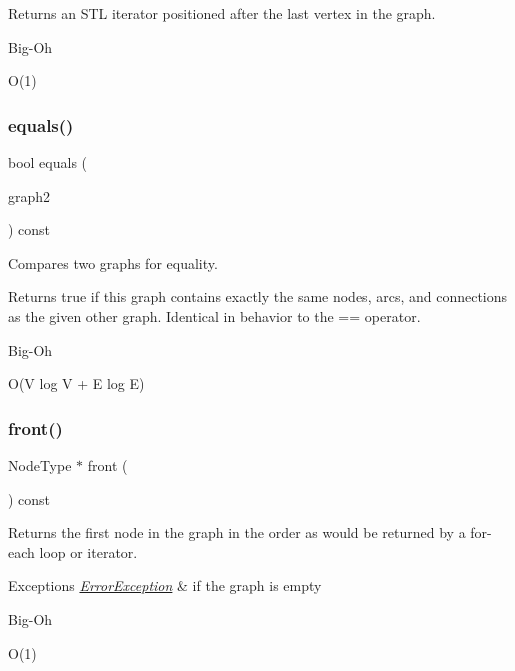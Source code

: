 Returns an S\+TL iterator positioned after the last vertex in the graph. 

\begin{DoxyRefDesc}{Big-\/\+Oh}
\item[\mbox{\hyperlink{BigOh__BigOh000092}{Big-\/\+Oh}}]O(1) \end{DoxyRefDesc}
\mbox{\label{classGraph_a6bec43eb3dfdf3d23eb328b406edf44a}} 
\subsubsection{\texorpdfstring{equals()}{equals()}}
{\footnotesize\ttfamily bool equals (\begin{DoxyParamCaption}\item[{const \mbox{\hyperlink{classGraph}{Graph}}$<$ Node\+Type, Arc\+Type $>$ \&}]{graph2 }\end{DoxyParamCaption}) const}



Compares two graphs for equality. 

Returns {\ttfamily true} if this graph contains exactly the same nodes, arcs, and connections as the given other graph. Identical in behavior to the == operator. \begin{DoxyRefDesc}{Big-\/\+Oh}
\item[\mbox{\hyperlink{BigOh__BigOh000058}{Big-\/\+Oh}}]O(V log V + E log E) \end{DoxyRefDesc}
\mbox{\label{classGraph_a7b7c2c1738f8e7faf84c54d7642992fa}} 
\subsubsection{\texorpdfstring{front()}{front()}}
{\footnotesize\ttfamily Node\+Type $\ast$ front (\begin{DoxyParamCaption}{ }\end{DoxyParamCaption}) const}



Returns the first node in the graph in the order as would be returned by a for-\/each loop or iterator. 


\begin{DoxyExceptions}{Exceptions}
{\em \mbox{\hyperlink{classErrorException}{Error\+Exception}}} & if the graph is empty \\
\hline
\end{DoxyExceptions}
\begin{DoxyRefDesc}{Big-\/\+Oh}
\item[\mbox{\hyperlink{BigOh__BigOh000059}{Big-\/\+Oh}}]O(1) \end{DoxyRefDesc}
\mbox{\label{classGraph_a7c33db338f839ff9e3dafe4fe61c16fd}} 
